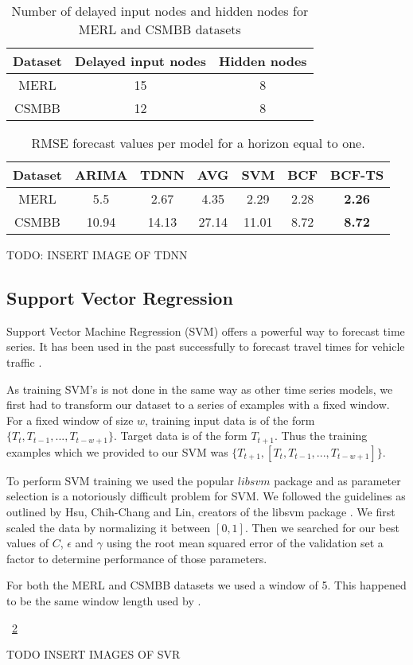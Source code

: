 \begin{table}[h]
\centering
\caption{Number of delayed input nodes and hidden nodes for MERL and CSMBB datasets}
\begin{tabular}{|c|c|c|} \hline
Dataset & Delayed input nodes & Hidden nodes\\ \hline
MERL & 15 & 8\\ \hline
CSMBB & 12 & 8\\ \hline
\end{tabular}
\label{fig:tdnntab}
\end{table}


\begin{table}[t!]
\centering
\caption{RMSE forecast values per model for a horizon equal to one.}
\begin{tabular}{|c|c|c|c|c|c|c|} \hline
Dataset & ARIMA & TDNN & AVG & SVM & BCF & BCF-TS\\ \hline
MERL & 5.5 & 2.67 & 4.35 & 2.29 & 2.28 & \textbf{2.26}\\ \hline
CSMBB & 10.94 & 14.13 & 27.14 & 11.01 & 8.72 & \textbf{8.72}\\ \hline
\end{tabular}
\label{fig:rmsetab}
\end{table}

TODO: INSERT IMAGE OF TDNN

\subsection{Support Vector Regression}
Support Vector Machine Regression (SVM) offers a powerful way to forecast time series.  It has been used in the past successfully to forecast travel times for vehicle traffic \cite{Wu2004}.  

As training SVM's is not done in the same way as other time series models, we first had to transform our dataset to a series of examples with a fixed window.  For a fixed window of size $w$, training input data is of the form $\{T_{t}, T_{t - 1}, ..., T_{t - w + 1}\}$.  Target data is of the form $T_{t + 1}$.  Thus the training examples which we provided to our SVM was $\{T_{t + 1}, [T_{t}, T_{t - 1}, ..., T_{t - w + 1}]\}$.

To perform SVM training we used the popular $libsvm$ package and as parameter selection is a notoriously difficult problem for SVM.  We followed the guidelines as outlined by Hsu, Chih-Chang and Lin, creators of the libsvm package \cite{Hsu2003}.  We first scaled the data by normalizing it between $[0, 1]$.  Then we searched for our best values of $C$, $\epsilon$ and $\gamma$ using the root mean squared error of the validation set a factor to determine performance of those parameters. 

For both the MERL and CSMBB datasets we used a window of 5.  This happened to be the same window length used by \cite{Wu2004}.

~\ref{fig:rmsetab}

TODO INSERT IMAGES OF SVR
